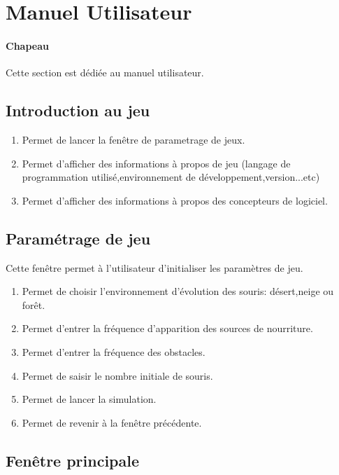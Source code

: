 \section{Manuel Utilisateur}
\label{sec:manuel}

\paragraph{Chapeau} Cette section est dédiée au manuel utilisateur.

\subsection{Introduction au jeu}


\begin{enumerate}
\item Permet de lancer la fenêtre de parametrage de jeux.
\item Permet d'afficher des informations à propos de jeu (langage de programmation utilisé,environnement de développement,version...etc)
\item Permet d'afficher des informations à propos des concepteurs de logiciel.
\end{enumerate}

\subsection{Paramétrage de jeu}
Cette fenêtre permet à l'utilisateur d'initialiser les paramètres de jeu.


\begin{enumerate}
\item Permet de choisir l'environnement d'évolution des souris: désert,neige ou forêt.
\item Permet d'entrer la fréquence d'apparition des sources de nourriture.
\item Permet d'entrer la fréquence des obstacles.
\item Permet de saisir le nombre initiale de souris.
\item Permet de lancer la simulation.
\item Permet de revenir à la fenêtre précédente.
\end{enumerate}
 
\subsection{Fenêtre principale}
 

